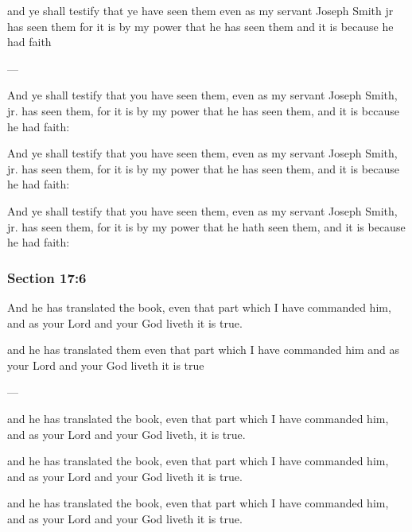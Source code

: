 		\begin{framed}
		\scriptsize
			\begin{compactdesc}
				\item[JSP] and ye shall testify that ye have seen them even as my servant Joseph Smith jr has seen them for it is by my power that he has seen them and it is because he had faith 
				\item[BC] --- 
				\item[MA] And ye shall testify that you have seen them, even as my servant Joseph Smith, jr. has seen them, for it is by my power that he has seen them, and it is bccause he had faith: 
				\item[DC 1835] And ye shall testify that you have seen them, even as my servant Joseph Smith, jr. has seen them, for it is by my power that he has seen them, and it is because he had faith: 
				\item[DC 1844] And ye shall testify that you have seen them, even as my servant Joseph Smith, jr. has seen them, for it is by my power that he hath seen them, and it is because he had faith: 
			\end{compactdesc}
		\end{framed}

	\subsubsection{Section 17:6} %
		\label{DC17-6}

		And he has translated the book, even that part which I have commanded him, and as your Lord and your God liveth it is true.

		\begin{framed}
		\scriptsize
			\begin{compactdesc}
				\item[JSP] and he has translated them even that part which I have commanded him and as your Lord and your God liveth it is true 
				\item[BC] --- 
				\item[MA] and he has translated the book, even that part which I have commanded him, and as your Lord and your God liveth, it is true.
				\item[DC 1835] and he has translated the book, even that part which I have commanded him, and as your Lord and your God liveth it is true.
				\item[DC 1844] and he has translated the book, even that part which I have commanded him, and as your Lord and your God liveth it is true.
			\end{compactdesc}
		\end{framed}

